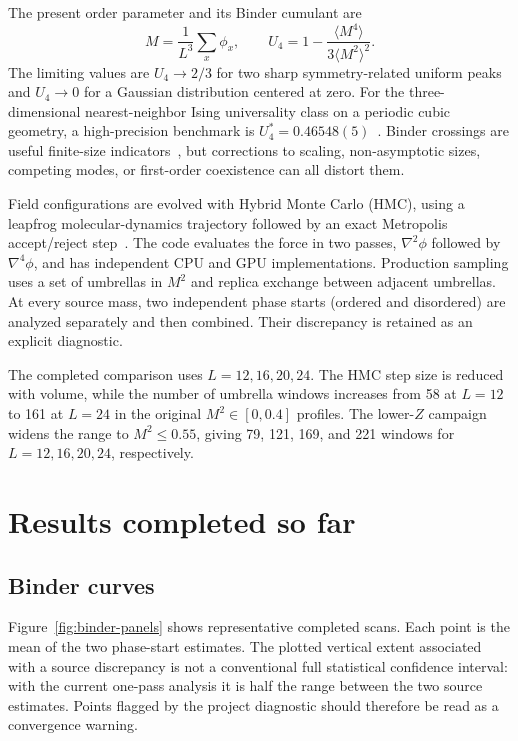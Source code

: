 \documentclass[11pt]{article}
\newcommand{\Ufour}{U_4}
\begin{document}
The present order parameter and its Binder cumulant are
\begin{equation}
  M=\frac{1}{L^3}\sum_x\phi_x,
  \qquad
  \Ufour=1-\frac{\langle M^4\rangle}
                    {3\langle M^2\rangle^2}.
  \label{eq:binder}
\end{equation}
The limiting values are $\Ufour\to2/3$ for two sharp symmetry-related uniform
peaks and $\Ufour\to0$ for a Gaussian distribution centered at zero.  For the
three-dimensional nearest-neighbor Ising universality class on a periodic
cubic geometry, a high-precision benchmark is
$\Ufour^*=0.46548(5)$~\cite{Ferrenberg2018}.  Binder crossings are useful
finite-size indicators~\cite{Binder1981}, but corrections to scaling,
non-asymptotic sizes, competing modes, or first-order coexistence can all
distort them.

Field configurations are evolved with Hybrid Monte Carlo (HMC), using a
leapfrog molecular-dynamics trajectory followed by an exact Metropolis
accept/reject step~\cite{Duane1987}.  The code evaluates the force in two
passes, $\nabla^2\phi$ followed by $\nabla^4\phi$, and has independent CPU and
GPU implementations.  Production sampling uses a set of umbrellas in $M^2$
and replica exchange between adjacent umbrellas.  At every source mass, two
independent phase starts (ordered and disordered) are analyzed separately and
then combined.  Their discrepancy is retained as an explicit diagnostic.

The completed comparison uses $L=12,16,20,24$.  The HMC step size is reduced
with volume, while the number of umbrella windows increases from 58 at $L=12$
to 161 at $L=24$ in the original $M^2\in[0,0.4]$ profiles.  The lower-$Z$
campaign widens the range to $M^2\leq0.55$, giving 79, 121, 169, and 221
windows for $L=12,16,20,24$, respectively.

\section{Results completed so far}

\subsection{Binder curves}

Figure~\ref{fig:binder-panels} shows representative completed scans.  Each
point is the mean of the two phase-start estimates.  The plotted vertical
extent associated with a source discrepancy is not a conventional full
statistical confidence interval: with the current one-pass analysis it is
half the range between the two source estimates.  Points flagged by the
project diagnostic should therefore be read as a convergence warning.
\end{document}
